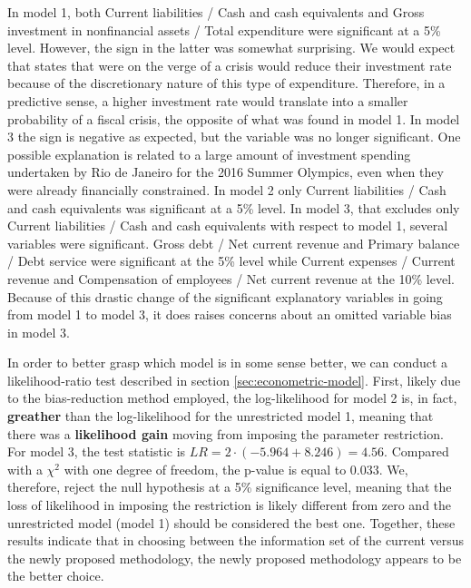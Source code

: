 In model 1, both Current liabilities / Cash and cash equivalents and Gross investment in nonfinancial assets / Total expenditure were significant at a 5\% level. However, the sign in the latter was somewhat surprising. We would expect that states that were on the verge of a crisis would reduce their investment rate because of the discretionary nature of this type of expenditure. Therefore, in a predictive sense, a higher investment rate would translate into a smaller probability of a fiscal crisis, the opposite of what was found in model 1. In model 3 the sign is negative as expected, but the variable was no longer significant. One possible explanation is related to a large amount of investment spending undertaken by Rio de Janeiro for the 2016 Summer Olympics, even when they were already financially constrained. In model 2 only Current liabilities / Cash and cash equivalents was significant at a 5\% level. In model 3, that excludes only Current liabilities / Cash and cash equivalents with respect to model 1, several variables were significant. Gross debt / Net current revenue and Primary balance / Debt service were significant at the 5\% level while Current expenses / Current revenue and Compensation of employees / Net current revenue at the 10\% level. Because of this drastic change of the significant explanatory variables in going from model 1 to model 3, it does raises concerns about an omitted variable bias in model 3.

In order to better grasp which model is in some sense better, we can conduct a likelihood-ratio test described in section \ref{sec:econometric-model}. First, likely due to the bias-reduction method employed, the log-likelihood for model 2 is, in fact, \textbf{greather} than the log-likelihood for the unrestricted model 1, meaning that there was a \textbf{likelihood gain} moving from imposing the parameter restriction. For model 3, the test statistic is $LR = 2 \cdot (-5.964 + 8.246) = 4.56$. Compared with a $\chi^2$ with one degree of freedom, the p-value is equal to $0.033$. We, therefore, reject the null hypothesis at a 5\% significance level, meaning that the loss of likelihood in imposing the restriction is likely different from zero and the unrestricted model (model 1) should be considered the best one. Together, these results indicate that in choosing between the information set of the current versus the newly proposed methodology, the newly proposed methodology appears to be the better choice.



